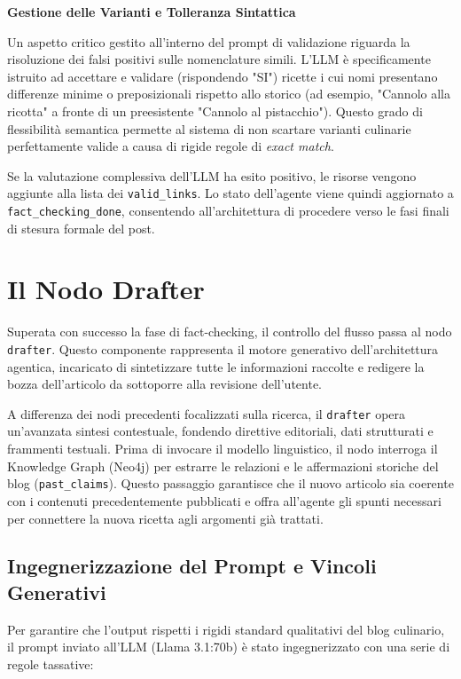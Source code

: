 \documentclass[11pt, a4paper]{article}
\begin{document}
\textbf{Gestione delle Varianti e Tolleranza Sintattica}

Un aspetto critico gestito all'interno del prompt di validazione riguarda la risoluzione dei falsi positivi sulle nomenclature simili. L'LLM è specificamente istruito ad accettare e validare (rispondendo "SI") ricette i cui nomi presentano differenze minime o preposizionali rispetto allo storico (ad esempio, "Cannolo alla ricotta" a fronte di un preesistente "Cannolo al pistacchio"). Questo grado di flessibilità semantica permette al sistema di non scartare varianti culinarie perfettamente valide a causa di rigide regole di \textit{exact match}.

Se la valutazione complessiva dell'LLM ha esito positivo, le risorse vengono aggiunte alla lista dei \texttt{valid\_links}. Lo stato dell'agente viene quindi aggiornato a \texttt{fact\_checking\_done}, consentendo all'architettura di procedere verso le fasi finali di stesura formale del post.

\section{Il Nodo Drafter}

Superata con successo la fase di fact-checking, il controllo del flusso passa al nodo \texttt{drafter}. Questo componente rappresenta il motore generativo dell'architettura agentica, incaricato di sintetizzare tutte le informazioni raccolte e redigere la bozza dell'articolo da sottoporre alla revisione dell'utente.

A differenza dei nodi precedenti focalizzati sulla ricerca, il \texttt{drafter} opera un'avanzata sintesi contestuale, fondendo direttive editoriali, dati strutturati e frammenti testuali. Prima di invocare il modello linguistico, il nodo interroga il Knowledge Graph (Neo4j) per estrarre le relazioni e le affermazioni storiche del blog (\texttt{past\_claims}). Questo passaggio garantisce che il nuovo articolo sia coerente con i contenuti precedentemente pubblicati e offra all'agente gli spunti necessari per connettere la nuova ricetta agli argomenti già trattati.

\subsection{Ingegnerizzazione del Prompt e Vincoli Generativi}

Per garantire che l'output rispetti i rigidi standard qualitativi del blog culinario, il prompt inviato all'LLM (Llama 3.1:70b) è stato ingegnerizzato con una serie di regole tassative:
\end{document}
